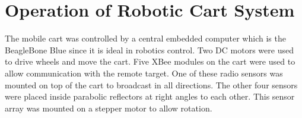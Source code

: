 \section{Operation of Robotic Cart System}
\label{sec:Operation of Robotic Cart System}
The mobile cart was controlled by a central embedded computer which is the BeagleBone Blue since it is ideal in robotics control. Two DC motors were used to drive wheels and move the cart. Five XBee modules on the cart were used to allow communication with the remote target. One of these radio sensors was mounted on top of the cart to broadcast in all directions. The other four sensors were placed inside parabolic reflectors at right angles to each other. This sensor array was mounted on a stepper motor to allow rotation.


